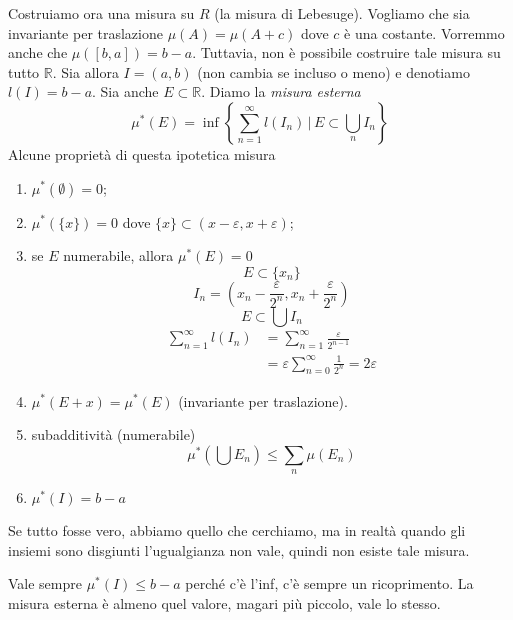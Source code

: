 \documentclass[a4paper]{article}
\begin{document}
Costruiamo ora una misura su \(R\) (la misura di Lebesuge).
Vogliamo che sia invariante per traslazione \(\mu(A) = \mu(A + c)\) dove \(c\) è una costante.
Vorremmo anche che \(\mu([b,a]) = b-a\). Tuttavia, non è possibile costruire tale misura su tutto
\(\mathbb{R}\). Sia allora \(I=(a,b)\) (non cambia se incluso o meno)
e denotiamo \(l(I) = b-a\). Sia anche \(E \subset \mathbb{R}\). Diamo la \emph{misura esterna}
\[
    \mu^*(E) = \inf \left\{
        \sum_{n=1}^\infty l(I_n) \,|\, E \subset \bigcup_n I_n
    \right\}
\]
Alcune proprietà di questa ipotetica misura
\begin{enumerate}
    \item \(\mu^*(\emptyset) = 0\);
    \item \(\mu^*(\{x\}) = 0\) dove \(\{x\} \subset (x-\varepsilon, x + \varepsilon)\);
    \item se \(E\) numerabile, allora \(\mu^*(E) = 0\)
    \[
        E \subset \{x_n\}
    \]
    \[
        I_n = \left(x_n - \frac{\varepsilon}{2^n}, x_n + \frac{\varepsilon}{2^n}\right)
    \]
    \[
        E \subset \bigcup I_n
    \]
    \begin{align*}
        \sum_{n=1}^\infty l(I_n) &= \sum_{n=1}^\infty \frac{\varepsilon}{2^{n-1}} \\
        &= \varepsilon \sum_{n=0}^\infty \frac{1}{2^n} = 2\varepsilon
    \end{align*}
    \item \(\mu^*(E + x) = \mu^*(E)\) (invariante per traslazione).
    \item subadditività (numerabile) \[
        \mu^*\left(\bigcup E_n\right) \leq \sum_n \mu(E_n)
    \]
    \item \(\mu^*(I) = b-a\)
\end{enumerate}

Se tutto fosse vero, abbiamo quello che cerchiamo, ma in realtà quando gli insiemi sono disgiunti
l'ugualgianza non vale, quindi non esiste tale misura.

Vale sempre \(\mu^*(I) \leq b-a\) perché c'è l'inf, c'è sempre un ricoprimento.
La misura esterna è almeno quel valore, magari più piccolo, vale lo stesso.
\end{document}
